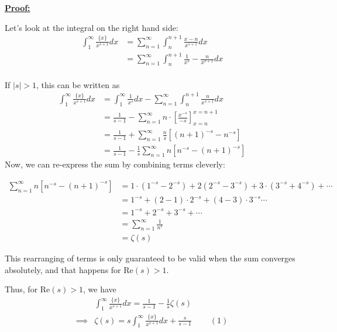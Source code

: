 \documentclass{article}
\begin{document}
\vskip 0.5cm
\underline{\textbf{Proof:}}

Let's look at the integral on the right hand side:
\begin{align*}
  \int_{1}^{\infty} \frac{\{x\}}{x^{s+1}} dx &= \sum_{n = 1}^{\infty} \int_{n}^{n+1} \frac{x-n}{x^{s+1}} dx \\
  &= \sum_{n = 1}^{\infty} \int_{n}^{n+1} \frac{1}{x^{s}} - \frac{n}{x^{s+1}} dx \\
\end{align*}

If $|s| > 1$, this can be written as 
\begin{align*}
  \int_{1}^{\infty} \frac{\{x\}}{x^{s+1}} dx &= \int_{1}^{\infty} \frac{1}{x^s} dx - \sum_{n = 1}^{\infty} \int_{n}^{n+1} \frac{n}{x^{s+1}} dx \\
  &= \frac{1}{s-1} - \sum_{n = 1}^{\infty} n \cdot \left[ \frac{x^{-s}}{-s} \right]_{x = n}^{x = n+1} \\
  &= \frac{1}{s-1} + \sum_{n = 1}^{\infty} \frac{n}{s} \left[(n+1)^{-s} - n^{-s}\right] \\
  &= \frac{1}{s-1} - \frac{1}{s} \sum_{n = 1}^{\infty} n \left[n^{-s} - (n+1)^{-s}\right]
\end{align*}
Now, we can re-express the sum by combining terms cleverly:

\begin{align*}
  \sum_{n = 1}^{\infty} n \left[n^{-s} - (n+1)^{-s}\right] &= 1 \cdot \left(1^{-s} - 2^{-s}\right) + 2 \left(2^{-s} - 3^{-s}\right) + 3\cdot \left(3^{-s} + 4^{-s}\right) + \cdots \\
  &= 1^{-s} + \left(2 - 1\right) \cdot 2^{-s} + \left(4-3\right) \cdot 3^{-s} \cdots \\
  &= 1^{-s} + 2^{-s} + 3^{-s} + \cdots \\
  &= \sum_{n = 1}^{\infty} \frac{1}{n^s} \\
  &= \zeta(s)
\end{align*}

This rearranging of terms is only guaranteed to be valid when the sum converges absolutely, and that happens for Re$(s) > 1$.

\vskip 0.5cm
Thus, for Re$(s) > 1$, we have 
\begin{align*}
  &\int_{1}^{\infty} \frac{\{x\}}{x^{s+1}} dx = \frac{1}{s-1} - \frac{1}{s} \zeta(s)  \\
  \implies &\boxed{\zeta(s) = s\int_{1}^{\infty} \frac{\{x\}}{x^{s+1}} dx + \frac{s}{s-1}} \;\;\;\;\;\;\;\;(1)
\end{align*}
\end{document}
